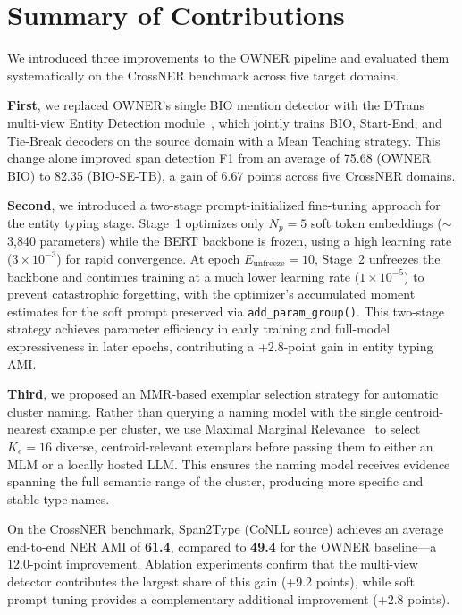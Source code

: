 \documentclass[14pt]{extreport}
\begin{document}
\section{Summary of Contributions}

We introduced three improvements to the OWNER pipeline and evaluated them systematically on the CrossNER benchmark across five target domains.

\textbf{First}, we replaced OWNER's single BIO mention detector with the DTrans multi-view Entity Detection module~\cite{zhang-etal-2024-dtrans}, which jointly trains BIO, Start-End, and Tie-Break decoders on the source domain with a Mean Teaching strategy. This change alone improved span detection F1 from an average of 75.68 (OWNER BIO) to 82.35 (BIO-SE-TB), a gain of 6.67 points across five CrossNER domains.

\textbf{Second}, we introduced a two-stage prompt-initialized fine-tuning approach for the entity typing stage. Stage~1 optimizes only $N_p = 5$ soft token embeddings ($\sim$3,840 parameters) while the BERT backbone is frozen, using a high learning rate ($3\times10^{-3}$) for rapid convergence. At epoch $E_{\text{unfreeze}} = 10$, Stage~2 unfreezes the backbone and continues training at a much lower learning rate ($1\times10^{-5}$) to prevent catastrophic forgetting, with the optimizer's accumulated moment estimates for the soft prompt preserved via \texttt{add\_param\_group()}. This two-stage strategy achieves parameter efficiency in early training and full-model expressiveness in later epochs, contributing a +2.8-point gain in entity typing AMI.

\textbf{Third}, we proposed an MMR-based exemplar selection strategy for automatic cluster naming. Rather than querying a naming model with the single centroid-nearest example per cluster, we use Maximal Marginal Relevance~\cite{carbonell-goldstein-1998-use} to select $K_e = 16$ diverse, centroid-relevant exemplars before passing them to either an MLM or a locally hosted LLM. This ensures the naming model receives evidence spanning the full semantic range of the cluster, producing more specific and stable type names.

On the CrossNER benchmark, Span2Type (CoNLL source) achieves an average end-to-end NER AMI of \textbf{61.4}, compared to \textbf{49.4} for the OWNER baseline—a 12.0-point improvement. Ablation experiments confirm that the multi-view detector contributes the largest share of this gain (+9.2 points), while soft prompt tuning provides a complementary additional improvement (+2.8 points).
\end{document}
